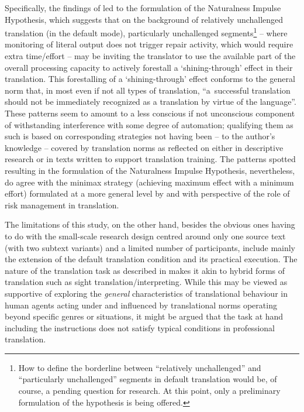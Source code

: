 \documentclass[output=paper]{langscibook}
\begin{document}
Specifically, the findings of  led to the formulation of the Naturalness Impulse Hypothesis, which suggests that on the background of relatively unchallenged translation (in the default mode), particularly unchallenged segments\footnote{How to define the borderline between “relatively unchallenged” and “particularly unchallenged” segments in default translation would be, of course, a pending question for research. At this point, only a preliminary formulation of the hypothesis is being offered.} – where monitoring of literal output does not trigger repair activity, which would require extra time/effort – may be inviting the translator to use the available part of the overall processing capacity to actively forestall a ‘shining-through’ effect in their translation. This forestalling of a ‘shining-through’ effect conforms to the general norm that, in most even if not all types of translation, “a~successful translation should not be immediately recognized as a translation by virtue of the language”. These patterns seem to amount to a less conscious if not unconscious component of withstanding interference with some degree of automation; qualifying them as such is based on corresponding strategies not having been – to the author’s knowledge – covered by translation norms as reflected on either in descriptive research or in texts written to support translation training. The patterns spotted resulting in the formulation of the Naturalness Impulse Hypothesis, nevertheless, do agree with the minimax strategy (achieving maximum effect with a minimum effort) formulated at a more general level by \citet{Levy1967} and with  perspective of the role of risk management in translation.

The limitations of this study, on the other hand, besides the obvious ones having to do with the small-scale research design centred around only one source text (with two subtext variants) and a limited number of participants, include mainly the extension of the default translation condition and its practical execution. The nature of the translation task as described in  makes it akin to hybrid forms of translation such as sight translation/interpreting. While this may be viewed as supportive of exploring the \textit{general} characteristics of translational behaviour in human agents acting under and influenced by translational norms operating beyond specific genres or situations, it might be argued that the task at hand including the instructions does not satisfy typical conditions in professional translation.
\end{document}
